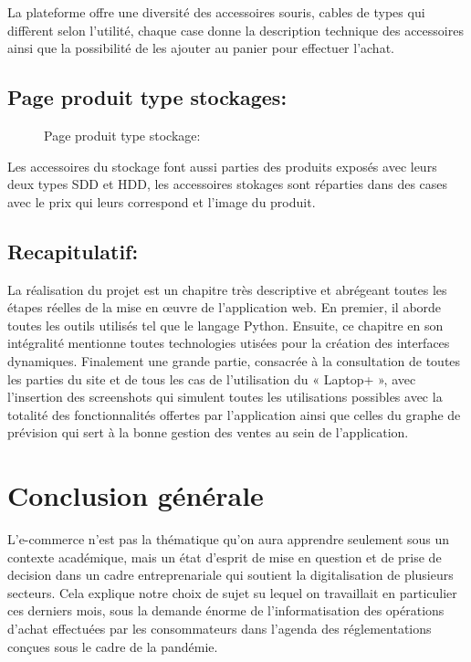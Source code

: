\documentclass[a4paper]{report}
\begin{document}
\begin{doublespace}
\begin{doublespace}
\begin{doublespace}
\begin{doublespace}
\begin{doublespace}
\begin{doublespace}
                        La plateforme offre une diversité des accessoires souris, cables de types qui diffèrent selon l'utilité, chaque case donne la description technique des accessoires ainsi que la possibilité de les ajouter au panier pour effectuer l'achat.

                        \subsection{Page produit type stockages:}
                        \begin{figure}[H]
                            \begin{center}
                                \caption{Page produit type stockage:}
                            \end{center}
                        \end{figure}

                        Les accessoires du stockage font aussi parties des produits exposés avec leurs deux types SDD et HDD, les accessoires stokages sont réparties dans des cases avec le prix qui leurs correspond et l'image du produit.
                        \subsection{Recapitulatif:}
                        La réalisation du projet est un chapitre très descriptive et abrégeant toutes les étapes réelles de la mise en œuvre de l'application web. En premier, il aborde toutes les outils utilisés tel que le langage  Python. Ensuite, ce chapitre en son intégralité mentionne toutes technologies utisées pour la création des interfaces dynamiques. Finalement une grande partie, consacrée à la consultation de toutes les parties du site et de tous les cas de l’utilisation du « Laptop+ », avec l’insertion des screenshots qui simulent toutes les utilisations possibles avec la totalité des fonctionnalités offertes par l'application ainsi que celles du graphe de prévision qui sert à la bonne gestion des ventes au sein de l'application.
                        \newpage
                        \section{\textbf{Conclusion générale  } }
                        L'e-commerce n'est pas la thématique qu'on aura apprendre seulement sous un contexte académique, mais un état d'esprit de mise en question et de prise de decision dans un cadre entreprenariale qui soutient la digitalisation de plusieurs secteurs. Cela explique notre choix de sujet su lequel on travaillait en particulier ces derniers mois, sous la demande énorme de l'informatisation des opérations d'achat effectuées par les consommateurs dans l'agenda des réglementations conçues sous le cadre de la pandémie.


\end{doublespace}
\end{doublespace}
\end{doublespace}
\end{doublespace}
\end{doublespace}
\end{doublespace}
\end{document}
